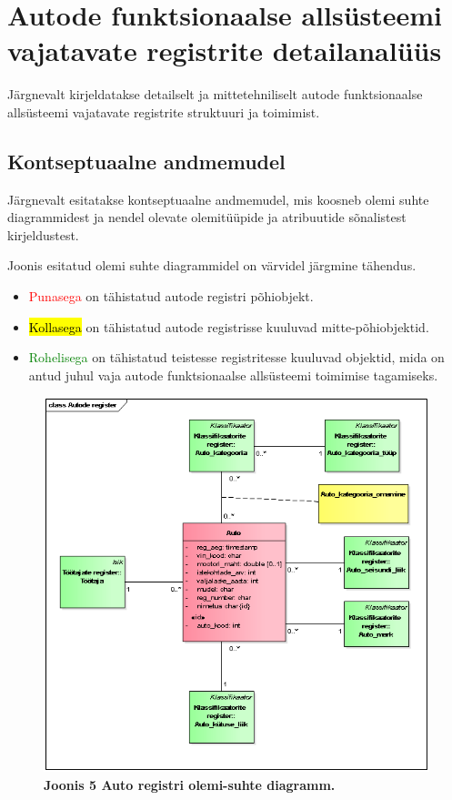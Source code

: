 \section{Autode funktsionaalse allsüsteemi vajatavate registrite detailanalüüs}
Järgnevalt kirjeldatakse detailselt ja mittetehniliselt autode funktsionaalse allsüsteemi vajatavate registrite struktuuri ja toimimist.

\subsection{Kontseptuaalne andmemudel}
Järgnevalt esitatakse kontseptuaalne andmemudel, mis koosneb olemi suhte diagrammidest ja nendel olevate olemitüüpide ja atribuutide sõnalistest kirjeldustest.  \vspace{\pVert} \\ \hfill

Joonis  esitatud olemi suhte diagrammidel on värvidel järgmine tähendus.
\begin{itemize}
	\item \textcolor{red}{Punasega} on tähistatud autode registri põhiobjekt.
	\item \hl{Kollasega} on tähistatud autode registrisse kuuluvad mitte-põhiobjektid.
	\item \textcolor{green}{Rohelisega} on tähistatud teistesse registritesse kuuluvad objektid, mida on antud juhul vaja autode funktsionaalse allsüsteemi toimimise tagamiseks.
\end{itemize}

\begin{figure}[H]
	\includegraphics[scale=1]{joonis5}
	\caption{\textbf{Joonis 5 Auto registri olemi-suhte diagramm.}}
\end{figure}

